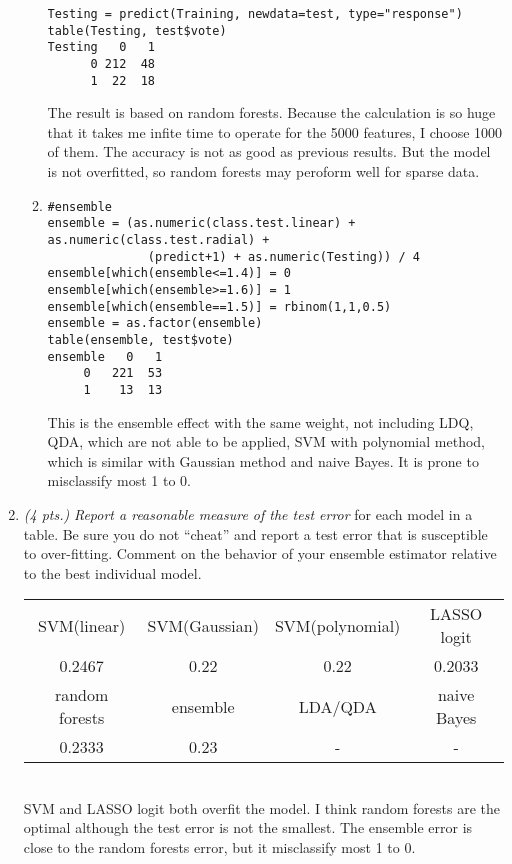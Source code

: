\documentclass[11pt,english]{article}
\begin{document}
\begin{enumerate}
\begin{enumerate}
\begin{verbatim}
Testing = predict(Training, newdata=test, type="response")
table(Testing, test$vote)
Testing   0   1
      0 212  48
      1  22  18
\end{verbatim}
The result is based on random forests.  Because the calculation is so huge that it takes me infite time to operate for the 5000 features, I choose 1000 of them.  The accuracy is not as good as previous results.  But the model is not overfitted, so random forests may peroform well for sparse data.
\item
\begin{verbatim}
#ensemble
ensemble = (as.numeric(class.test.linear) + as.numeric(class.test.radial) +
              (predict+1) + as.numeric(Testing)) / 4
ensemble[which(ensemble<=1.4)] = 0
ensemble[which(ensemble>=1.6)] = 1
ensemble[which(ensemble==1.5)] = rbinom(1,1,0.5)
ensemble = as.factor(ensemble)
table(ensemble, test$vote)
ensemble   0   1
     0   221  53
     1    13  13
\end{verbatim}
This is the ensemble effect with the same weight, not including LDQ, QDA, which are not able to be  applied, SVM with polynomial method, which is similar with Gaussian method and naive Bayes.  It is prone to misclassify most 1 to 0.

\end{enumerate}


\item \textit{(4 pts.)} \textit{Report a reasonable measure of the test error} for each model in a table. Be sure you do not ``cheat'' and report a test error that is susceptible to over-fitting. Comment on the behavior of your ensemble estimator relative to the best individual model.\par

\begin{tabular}{|c|c|c|c|}
  \hline
  SVM(linear) & SVM(Gaussian) & SVM(polynomial) & LASSO logit  \\
  0.2467 & 0.22 & 0.22 & 0.2033   \\
  \hline
  random forests & ensemble & LDA/QDA & naive Bayes \\
  0.2333 & 0.23 & - & -\\
  \hline
\end{tabular} \\
SVM and LASSO logit both overfit the model.  I think random forests are the optimal although the test error is not the smallest.  The ensemble error is close to the random forests error, but it misclassify most 1 to 0.


\end{enumerate}
\end{document}
